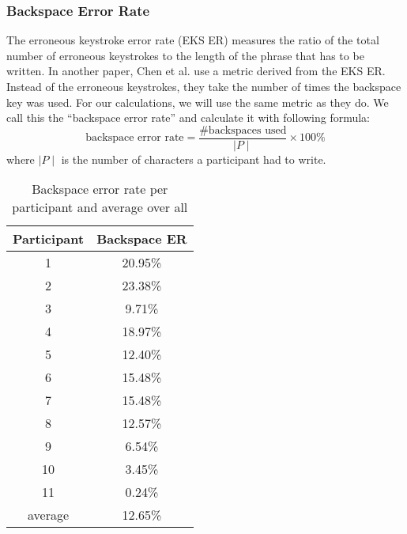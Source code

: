 \subsubsection{Backspace Error Rate}
The erroneous keystroke error rate (EKS ER) \cite{ArifTextEntry} measures the ratio of the total number of erroneous keystrokes to the length of the phrase that has to be written. In another paper, Chen et al. \cite{10.1145/3290607.3312762} use a metric derived from the EKS ER. Instead of the erroneous keystrokes, they take the number of times the backspace key was used. For our calculations, we will use the same metric as they do. We call this the ``backspace error rate'' and calculate it with following formula:
\begin{equation}
    \text{backspace error rate} = \frac{\text{\#backspaces used}}{\mid P \mid} \times 100\%
\end{equation}
where $\mid P \mid$ is the number of characters a participant had to write.
\iffalse
\begin{figure}[H]
    \centering
    \makebox[\textwidth][c]{
        \centering
        \subbottom[backspace error rate compared to wpm\label{fig:error_backspace:error_backspace1}]{\texttt{[image: backspace\_error2.pdf]}}\hspace{-3.0em}
        \subbottom[a boxplot for the backspace error rate over all participants. The orange line is for the median, the rectangle shows the 25\% and 75\% quartiles, and the upper and lower whiskers show the maximum and minimum.
        \vspace{-3em}
        \label{fig:error_backspace:error_backspace2}]{\texttt{[image: ekser\_boxplot.pdf]}}
    }
    \vspace{2em}
    \caption{shows the backspace error rate in two different ways. (a) with a comparison to the wpm of each participant and (b) a boxplot combining all participants' backspace error values.}
    \label{fig:error_backspace}
\end{figure}
\fi
\begin{table}[H]
    \centering
    \caption{Backspace error rate per participant and average over all}
    \begin{tabular}{cc} \toprule
        Participant&Backspace ER\\ \midrule
        1 & 20.95\%\\
        2 & 23.38\%\\
        3 & 9.71\%\\
        4 & 18.97\%\\
        5 & 12.40\%\\
        6 & 15.48\%\\
        7 & 15.48\%\\
        8 & 12.57\%\\
        9 & 6.54\%\\
        10 & 3.45\%\\
        11 & 0.24\%\\
        \midrule
        average & 12.65\%\\
        \bottomrule
    \end{tabular}
    \label{tab:backspace_er}
\end{table}
